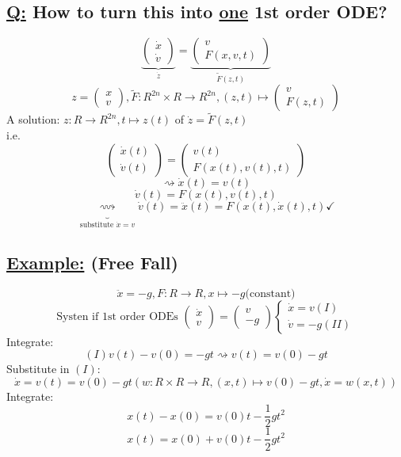 \documentclass[a4paper, 12pt]{article}
\begin{document}
\subsection{\underline{Q:} How to turn this into \underline{one} 1st order ODE?}
$$\underbrace{\begin{pmatrix} \dot{x}\\ \dot{v} \end{pmatrix}}_{\dot{z}} = \underbrace{\begin{pmatrix} v \\ F(x,v,t) \end{pmatrix}}_{\tilde{F}(z,t)}$$
$$ z = \begin{pmatrix} x \\ v \end{pmatrix}, \tilde{F}:R^{2n} \times R \rightarrow R^{2n}, (z,t) \mapsto \begin{pmatrix} v \\ F(z,t) \end{pmatrix}$$
A solution: $z: R \rightarrow R^{2n}, t \mapsto z(t)$ of $\dot{z} = \tilde{F}(z,t)$\\
i.e. $$\begin{pmatrix} \dot{x}(t) \\ \dot{v}(t) \end{pmatrix} = \begin{pmatrix} v(t) \\ F(x(t), v(t), t) \end{pmatrix}$$
$$\rightsquigarrow \dot{x}(t) = v(t)$$ $$\dot{v}(t) = F(x(t), v(t), t)$$
$$\underbrace{\rightsquigarrow}_{\text{substitute } \dot{x} = v} \dot{v}(t) = \ddot{x}(t) = F(x(t), \dot{x}(t), t) \checkmark$$
\subsection{\underline{Example:} (Free Fall)}
$$\ddot{x} = -g, F:R \rightarrow R, x \mapsto -g \text{(constant)}$$
\begin{equation*}
\text{Systen if 1st order ODEs } \begin{pmatrix} \dot{x} \\ v \end{pmatrix} = \begin{pmatrix} v \\ - g \end{pmatrix}
\begin{cases}
\dot{x} = v (I)\\
\dot{v} = -g (II)
\end{cases}
\end{equation*}
Integrate: $$(I) v(t) - v(0) = -gt \rightsquigarrow v(t) = v(0) - gt$$
Substitute in $(I)$: $$\dot{x} = v(t) = v(0) - gt (w:R \times R \rightarrow R, (x,t) \mapsto v(0) - gt, \dot{x} = w(x,t))$$
Integrate: $$x(t) - x(0) = v(0) t - \frac{1}{2} gt^2$$ $$x(t) = x(0) + v(0)t - \frac{1}{2} gt^2$$
\end{document}
